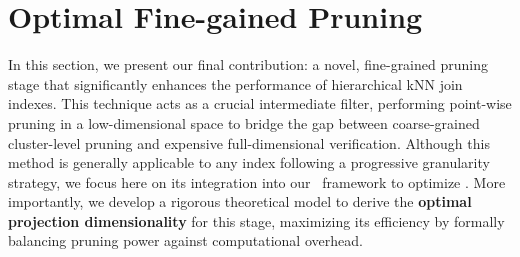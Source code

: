 \section{Optimal Fine-gained Pruning}\label{sec:pruning}



In this section, we present our final contribution: a novel, fine-grained pruning stage that significantly enhances the performance of hierarchical kNN join indexes. This technique acts as a crucial intermediate filter, performing point-wise pruning in a low-dimensional space to bridge the gap between coarse-grained cluster-level pruning and expensive full-dimensional verification. Although this method is generally applicable to any index following a progressive granularity strategy, we focus here on its integration into our \dualtree\ framework to optimize \fdknnj. More importantly, we develop a rigorous theoretical model to derive the \textbf{optimal projection dimensionality} for this stage, maximizing its efficiency by formally balancing pruning power against computational overhead.

